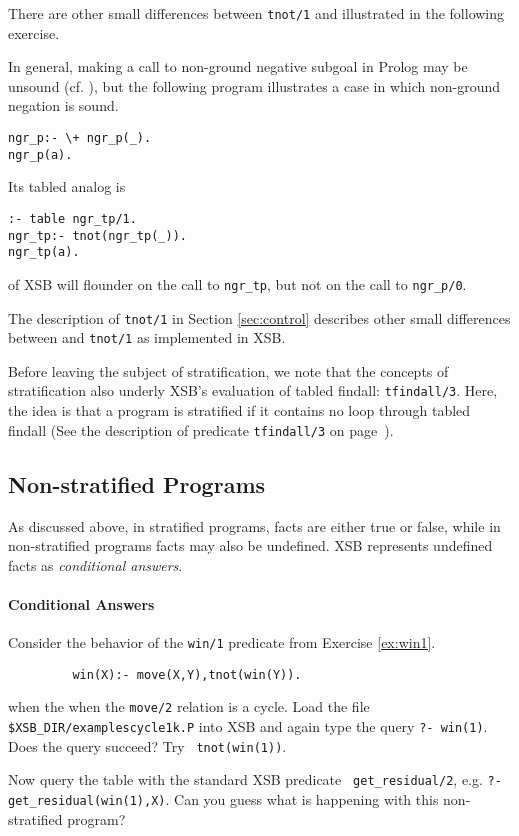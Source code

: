 There are other small differences between {\tt tnot/1} and \not
illustrated in the following exercise.

\begin{exercise}
In general, making a call to non-ground negative subgoal in Prolog may
be unsound (cf. \cite{Lloy84}), but the following program illustrates
a case in which non-ground negation is sound.
\begin{verbatim}
ngr_p:- \+ ngr_p(_).
ngr_p(a).
\end{verbatim}
Its tabled analog is 
\begin{verbatim}
:- table ngr_tp/1.
ngr_tp:- tnot(ngr_tp(_)).
ngr_tp(a).
\end{verbatim}
\version{} of XSB will flounder on the call to {\tt ngr\_tp}, but not
on the call to {\tt ngr\_p/0}.  

The description of {\tt tnot/1} in Section \ref{sec:control} describes
other small differences between \not and {\tt tnot/1} as implemented
in XSB\@.
\end{exercise}

Before leaving the subject of stratification, we note that the
concepts of stratification also underly XSB's evaluation of tabled
findall: {\tt tfindall/3}.  Here, the idea is that a program is
stratified if it contains no loop through tabled findall (See the
description of predicate {\tt tfindall/3} on
page~\pageref{tfindall/3}).

\subsection{Non-stratified Programs}

As discussed above, in stratified programs, facts are either true or
false, while in non-stratified programs facts may also be undefined.
XSB represents undefined facts as {\em conditional answers}.

\paragraph*{Conditional Answers}

\begin{exercise}
Consider the behavior of the {\tt win/1} predicate from Exercise
\ref{ex:win1}.
\begin{verbatim}
         win(X):- move(X,Y),tnot(win(Y)).
\end{verbatim}
when the when the {\tt move/2} relation is a cycle.  Load the file
{\tt \verb|$XSB_DIR/examples|cycle1k.P} into XSB and again type the
query {\tt ?- win(1)}.  Does the query succeed?  Try {\tt
tnot(win(1))}.

Now query the table with the standard XSB predicate {\tt
get\_residual/2}, e.g. {\tt ?- get\_residual(win(1),X)}.  Can you guess
what is happening with this non-stratified program?
\end{exercise}

